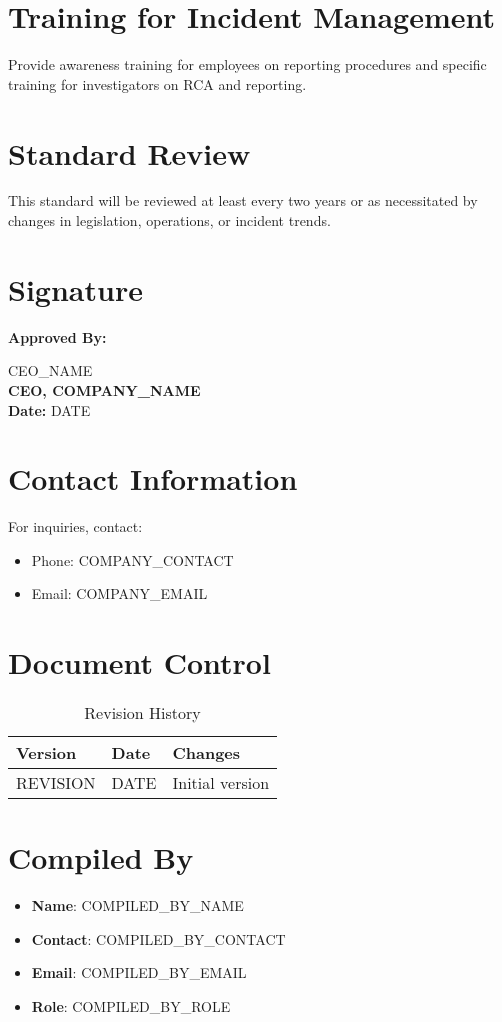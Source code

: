 \documentclass[12pt]{article}
\begin{document}
\section{Training for Incident Management}
Provide awareness training for employees on reporting procedures and specific training for investigators on RCA and reporting.

\section{Standard Review}
This standard will be reviewed at least every two years or as necessitated by changes in legislation, operations, or incident trends.

\section{Signature}
\textbf{Approved By:}

{{CEO_NAME}}\\
\textbf{CEO, {{COMPANY_NAME}}}\\
\textbf{Date:} {{DATE}}

\section{Contact Information}
For inquiries, contact:
\begin{itemize}
    \item Phone: {{COMPANY_CONTACT}}
    \item Email: {{COMPANY_EMAIL}}
\end{itemize}

\section{Document Control}
\begin{table}[h]
    \centering
    \begin{tabular}{p{3cm}p{3cm}p{6cm}}
        \toprule
        \textbf{Version} & \textbf{Date} & \textbf{Changes} \\
        \midrule
        {{REVISION}} & {{DATE}} & Initial version \\
        \bottomrule
    \end{tabular}
    \caption{Revision History}
\end{table}

\section{Compiled By}
\begin{itemize}
    \item \textbf{Name}: {{COMPILED_BY_NAME}}
    \item \textbf{Contact}: {{COMPILED_BY_CONTACT}}
    \item \textbf{Email}: {{COMPILED_BY_EMAIL}}
    \item \textbf{Role}: {{COMPILED_BY_ROLE}}
\end{itemize}
\end{document}
